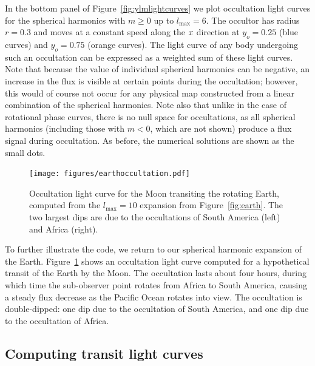 \documentclass[modern]{aastex61}
\begin{document}
In the bottom panel of Figure~\ref{fig:ylmlightcurves} we plot
occultation light curves for the spherical harmonics with $m \ge 0$
up to $l_\mathrm{max} = 6$. The occultor has radius $r = 0.3$ and
moves at a constant speed along the $\mbox{$x$}$ direction at $y_o = 0.25$
(blue curves) and $y_o = 0.75$ (orange curves). The light curve of
any body undergoing such an occultation can be expressed as a weighted
sum of these light curves. Note that because the value of individual
spherical harmonics can be negative, an increase in the flux is visible
at certain points during the occultation; however, this would of course not
occur for any physical map constructed from a linear combination of
the spherical harmonics. Note also that unlike in the case of rotational phase curves,
there is no null space for occultations, as all spherical harmonics (including
those with $m < 0$, which are not shown) produce a flux signal during
occultation. As before, the numerical solutions are shown as the small dots.

%
\begin{figure}[ht!]
    \begin{centering}
    \texttt{[image: figures/earthoccultation.pdf]}
    \caption{\label{fig:earthoccultation}
             Occultation light curve for the Moon transiting the
             rotating Earth,
             computed from the $l_\mathrm{max} = 10$ expansion from
             Figure~\ref{fig:earth}. The two largest dips are due
             to the occultations of South America (left) and Africa
             (right).}
    \end{centering}
\end{figure}
%

To further illustrate the code, we return to our spherical harmonic
expansion of the Earth.
Figure~\ref{fig:earthoccultation} shows an occultation light curve
computed for a hypothetical transit of the Earth by the Moon. The
occultation lasts about four hours, during which time
the sub-observer point rotates from Africa to South America, causing a
steady flux decrease as the Pacific Ocean rotates into view. The
occultation is double-dipped: one dip due to the occultation of South
America, and one dip due to the occultation of Africa.

\subsection{Computing transit light curves}
\label{sec:starrytransits}
\end{document}
